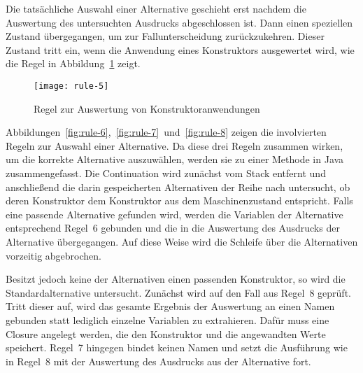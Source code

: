 Die tatsächliche Auswahl einer Alternative geschieht erst nachdem die Auswertung des untersuchten Ausdrucks abgeschlossen ist.
Dann einen speziellen Zustand übergegangen, um zur Fallunterscheidung zurückzukehren.
Dieser Zustand tritt ein, wenn die Anwendung eines Konstruktors ausgewertet wird, wie die Regel in Abbildung~\ref{fig:rule-5} zeigt.

\begin{figure}[h]
  \centering
  \texttt{[image: rule-5]}
  \caption{Regel zur Auswertung von Konstruktoranwendungen}\label{fig:rule-5}
\end{figure}

Abbildungen~\ref{fig:rule-6},~\ref{fig:rule-7}~und~\ref{fig:rule-8} zeigen die involvierten Regeln zur Auswahl einer Alternative.
Da diese drei Regeln zusammen wirken, um die korrekte Alternative auszuwählen, werden sie zu einer Methode in Java zusammengefasst.
Die Continuation wird zunächst vom Stack entfernt und anschließend die darin gespeicherten Alternativen der Reihe nach untersucht, ob deren Konstruktor dem Konstruktor aus dem Maschinenzustand entspricht.
Falls eine passende Alternative gefunden wird, werden die Variablen der Alternative entsprechend Regel~6 gebunden und die in die Auswertung des Ausdrucks der Alternative übergegangen.
Auf diese Weise wird die Schleife über die Alternativen vorzeitig abgebrochen.

Besitzt jedoch keine der Alternativen einen passenden Konstruktor, so wird die Standardalternative untersucht.
Zunächst wird auf den Fall aus Regel~8 geprüft.
Tritt dieser auf, wird das gesamte Ergebnis der Auswertung an einen Namen gebunden statt lediglich einzelne Variablen zu extrahieren.
Dafür muss eine Closure angelegt werden, die den Konstruktor und die angewandten Werte speichert.
Regel~7 hingegen bindet keinen Namen und setzt die Ausführung wie in Regel~8 mit der Auswertung des Ausdrucks aus der Alternative fort.

\vfill

